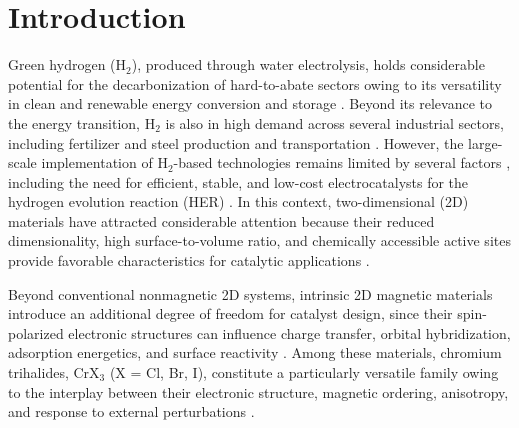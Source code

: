 \documentclass[journal=jacsat,manuscript=article]{achemso}
\begin{document}


\section{Introduction}

\noindent Green hydrogen (H$_2$), produced through water electrolysis, holds considerable potential for the decarbonization of hard-to-abate sectors owing to its versatility in clean and renewable energy conversion and storage \cite{ZAINAL2024113941, SAKTHIMURUGAN2025104849}. Beyond its relevance to the energy transition, H$_2$ is also in high demand across several industrial sectors, including fertilizer and steel production and transportation \cite{pr12020315, ROPER2025687}. However, the large-scale implementation of H$_2$-based technologies remains limited by several factors \cite{SAKTHIMURUGAN2025104849, Odenweller2025}, including the need for efficient, stable, and low-cost electrocatalysts for the hydrogen evolution reaction (HER) \cite{Liao2022,Ipaves2025,doi:10.1021/acsaem.6c00060,doi:10.1021/acsomega.5c07529,quispe2026controllingactivitystabilitygamma}. In this context, two-dimensional (2D) materials have attracted considerable attention because their reduced dimensionality, high surface-to-volume ratio, and chemically accessible active sites provide favorable characteristics for catalytic applications \cite{doi:10.1021/acsaem.6c00060, DEYACSAPPENERMATER2026}.

Beyond conventional nonmagnetic 2D systems, intrinsic 2D magnetic materials introduce an additional degree of freedom for catalyst design, since their spin-polarized electronic structures can influence charge transfer, orbital hybridization, adsorption energetics, and surface reactivity \cite{Ipaves2025,doi:10.1021/acscatal.2c06319,Sun2023,Duan2021}. Among these materials, chromium trihalides, CrX$_3$ (X = Cl, Br, I), constitute a particularly versatile family owing to the interplay between their electronic structure, magnetic ordering, anisotropy, and response to external perturbations \cite{Soriano2020,Besbes2019,Lee2026,Kvashnin2020,GarridoAldea2025}.
\end{document}

